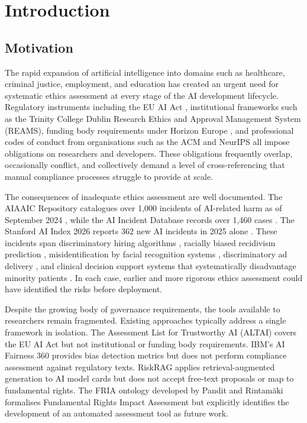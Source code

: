 \chapter{Introduction}
\label{ch:introduction}

\section{Motivation}

The rapid expansion of artificial intelligence into domains such as healthcare, criminal justice, employment, and education has created an urgent need for systematic ethics assessment at every stage of the AI development lifecycle. Regulatory instruments including the EU AI Act \cite{euaiact2024}, institutional frameworks such as the Trinity College Dublin Research Ethics and Approval Management System (REAMS), funding body requirements under Horizon Europe \cite{horizonethics2021}, and professional codes of conduct from organisations such as the ACM \cite{acmethics2018} and NeurIPS \cite{neurips2021} all impose obligations on researchers and developers. These obligations frequently overlap, occasionally conflict, and collectively demand a level of cross-referencing that manual compliance processes struggle to provide at scale.

The consequences of inadequate ethics assessment are well documented. The AIAAIC Repository catalogues over 1,000 incidents of AI-related harm as of September 2024 \cite{aiaaic2024}, while the AI Incident Database records over 1,460 cases \cite{aiid2024}. The Stanford AI Index 2026 reports 362 new AI incidents in 2025 alone \cite{stanfordaiindex2026}. These incidents span discriminatory hiring algorithms \cite{amazonhiring2018}, racially biased recidivism prediction \cite{compas2016}, misidentification by facial recognition systems \cite{rekognition2019}, discriminatory ad delivery \cite{facebookads2019}, and clinical decision support systems that systematically disadvantage minority patients \cite{optum2019}. In each case, earlier and more rigorous ethics assessment could have identified the risks before deployment.

Despite the growing body of governance requirements, the tools available to researchers remain fragmented. Existing approaches typically address a single framework in isolation. The Assessment List for Trustworthy AI (ALTAI) \cite{altai2020} covers the EU AI Act but not institutional or funding body requirements. IBM's AI Fairness 360 \cite{aif360} provides bias detection metrics but does not perform compliance assessment against regulatory texts. RiskRAG \cite{riskrag2025} applies retrieval-augmented generation to AI model cards but does not accept free-text proposals or map to fundamental rights. The FRIA ontology developed by Pandit and Rintam\"{a}ki \cite{pandit2024fria} formalises Fundamental Rights Impact Assessment but explicitly identifies the development of an automated assessment tool as future work.

